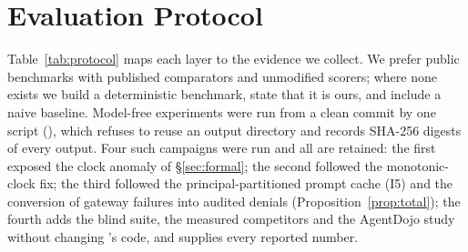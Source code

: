 \section{Evaluation Protocol}
\label{sec:protocol}
Table~\ref{tab:protocol} maps each layer to the evidence we collect. We prefer public benchmarks with published comparators and unmodified scorers; where none exists we build a deterministic benchmark, state that it is ours, and include a naive baseline. Model-free experiments were run from a clean commit by one script (), which refuses to reuse an output directory and records SHA-256 digests of every output. Four such campaigns were run and all are retained: the first exposed the clock anomaly of \S\ref{sec:formal}; the second followed the monotonic-clock fix; the third followed the principal-partitioned prompt cache (I5) and the conversion of gateway failures into audited denials (Proposition~\ref{prop:total}); the fourth adds the blind suite, the measured competitors and the AgentDojo study without changing \method{}'s code, and supplies every reported number.

